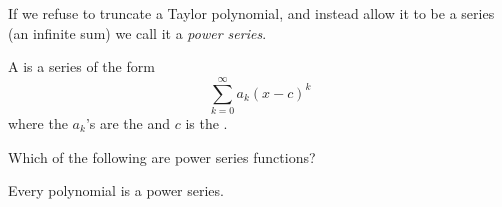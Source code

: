 \documentclass{ximera}
\begin{document}
If we refuse to truncate a Taylor polynomial, and instead allow it to
be a series (an infinite sum) we call it a \textit{power series}. 

\begin{definition}
  A  is a series of the form
  \[
  \sum_{k=0}^\infty a_k(x-c)^k
  \]
  where the $a_k$'s are the  and $c$ is the
  .
\end{definition}

\begin{question}
  Which of the following are power series functions?
  \begin{selectAll}
  \end{selectAll}
  \begin{hint}
    Every polynomial is a power series.
  \end{hint}
\end{question}
\end{document}
